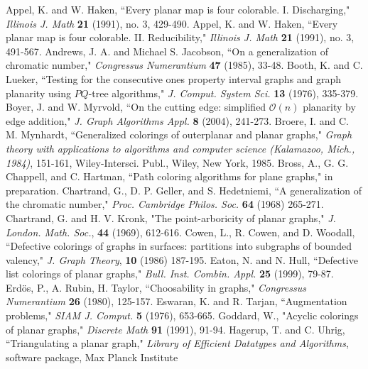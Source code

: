 \documentclass[letterpaper, 12pt]{article}
\theoremstyle{definition}
\theoremstyle{definition}
\theoremstyle{thm}
\theoremstyle{definition}
\begin{document}
\begin{thebibliography}{99}  %
	Appel, K. and W. Haken, ``Every planar map is four colorable. I.
	Discharging," \textit{Illinois J. Math} \textbf{21} (1991), no. 3, 429-490.
	Appel, K. and W. Haken, ``Every planar map is four colorable. II.
	Reducibility," \textit{Illinois J. Math} \textbf{21} (1991), no. 3, 491-567.
	Andrews, J. A. and Michael S. Jacobson, ``On a generalization of chromatic number,"
	\textit{Congressus Numerantium} \textbf{47} (1985), 33-48.
	Booth, K. and C. Lueker, ``Testing for the consecutive ones property interval
	graphs and graph planarity using $PQ$-tree algorithms," \textit{J. Comput.
	System Sci.} \textbf{13} (1976), 335-379.
	Boyer, J. and W. Myrvold, ``On the cutting edge: simplified $\mathcal{O}(n)$ planarity by
	edge addition," \textit{J. Graph Algorithms Appl.} \textbf{8} (2004), 241-273.
	Broere, I. and C. M. Mynhardt, ``Generalized colorings of outerplanar and planar
	graphs," \textit{Graph theory with applications to algorithms and computer
	science (Kalamazoo, Mich., 1984)}, 151-161, Wiley-Intersci. Publ., Wiley,
	New York, 1985.
    Bross, A., G. G. Chappell, and C. Hartman, ``Path
    coloring algorithms for plane graphs," in preparation.
	Chartrand, G., D. P. Geller, and S. Hedetniemi, ``A generalization of the
	chromatic number," \textit{Proc. Cambridge Philos. Soc.} \textbf{64} (1968)
	265-271.
    Chartrand, G. and H. V. Kronk, "The point-arboricity of planar graphs,"
    \textit{J. London. Math. Soc.}, \textbf{44} (1969), 612-616.
	Cowen, L., R. Cowen, and D. Woodall, ``Defective colorings of graphs in
	surfaces: partitions into subgraphs of bounded valency,"
	\textit{J. Graph Theory}, \textbf{10} (1986) 187-195.
	Eaton, N. and N. Hull, ``Defective list colorings of planar graphs,"
	\emph{Bull. Inst. Combin. Appl.} \textbf{25} (1999), 79-87.
	Erd{\"o}s, P., A. Rubin, H. Taylor, ``Choosability in graphs,"
	\textit{Congressus Numerantium} \textbf{26} (1980), 125-157.
	Eswaran, K. and R. Tarjan, ``Augmentation problems," \textit{SIAM J. Comput.}
	\textbf{5} (1976), 653-665.
    Goddard, W., "Acyclic colorings of planar graphs," \textit{Discrete Math}
    \textbf{91} (1991), 91-94.
	Hagerup, T. and C. Uhrig, ``Triangulating a planar graph," \textit{Library of
	Efficient Datatypes and Algorithms}, software package, Max Planck Institute

\end{thebibliography}
\end{document}
